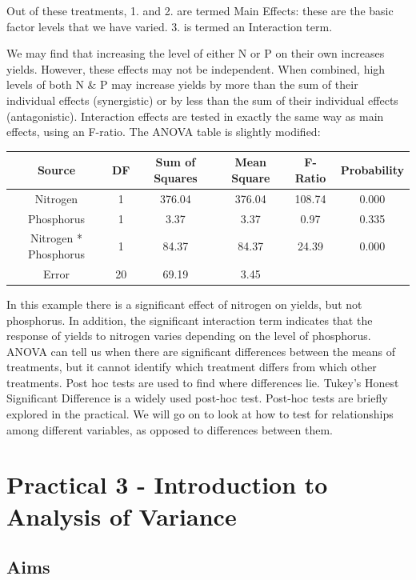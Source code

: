 \documentclass[
]{book}
\begin{document}
Out of these treatments, 1. and 2. are termed Main Effects: these are the basic factor levels that we have varied. 3. is termed an Interaction term.

We may find that increasing the level of either N or P on their own increases yields. However, these effects may not be independent. When combined, high levels of both N \& P may increase yields by more than the sum of their individual effects (synergistic) or by less than the sum of their individual effects (antagonistic). Interaction effects are tested in exactly the same way as main effects, using an F-ratio. The ANOVA table is slightly modified:

\begin{longtable}[]{@{}cccccc@{}}
\toprule\noalign{}
Source & DF & Sum of Squares & Mean Square & F-Ratio & Probability \\
\midrule\noalign{}
\endhead
\bottomrule\noalign{}
\endlastfoot
Nitrogen & 1 & 376.04 & 376.04 & 108.74 & 0.000 \\
Phosphorus & 1 & 3.37 & 3.37 & 0.97 & 0.335 \\
Nitrogen * Phosphorus & 1 & 84.37 & 84.37 & 24.39 & 0.000 \\
Error & 20 & 69.19 & 3.45 & & \\
\end{longtable}

In this example there is a significant effect of nitrogen on yields, but not phosphorus. In addition, the significant interaction term indicates that the response of yields to nitrogen varies depending on the level of phosphorus. ANOVA can tell us when there are significant differences between the means of treatments, but it cannot identify which treatment differs from which other treatments. Post hoc tests are used to find where differences lie. Tukey's Honest Significant Difference is a widely used post-hoc test. Post-hoc tests are briefly explored in the practical. We will go on to look at how to test for relationships among different variables, as opposed to differences between them.

\hypertarget{practical-3---introduction-to-analysis-of-variance}{%
\section{Practical 3 - Introduction to Analysis of Variance}\label{practical-3---introduction-to-analysis-of-variance}}

\hypertarget{aims}{%
\subsection{Aims}\label{aims}}
\end{document}
